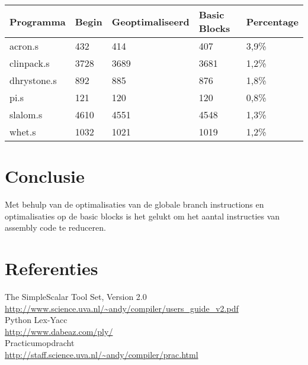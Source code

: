 \documentclass[11pt]{article}
\begin{document}
\begin{tabular}{|l|l|l|l|l|}
\hline
Programma & Begin & Geoptimaliseerd & Basic Blocks & Percentage\\
\hline
acron.s     & 432  & 414  & 407  & 3,9\%\\
clinpack.s  & 3728 & 3689 & 3681 & 1,2\%\\
dhrystone.s & 892  & 885  & 876  & 1,8\%\\
pi.s        & 121  & 120  & 120  & 0,8\%\\
slalom.s    & 4610 & 4551 & 4548 & 1,3\%\\
whet.s      & 1032 & 1021 & 1019 & 1,2\%\\
\hline
\end{tabular}

\section{Conclusie}
Met behulp van de optimalisaties van de globale branch instructions en 
optimalisaties op de basic blocks is het gelukt om het aantal instructies
van assembly code te reduceren. 

\section{Referenties}

The SimpleScalar Tool Set, Version 2.0\\
\url{http://www.science.uva.nl/~andy/compiler/users_guide_v2.pdf}\\
Python Lex-Yacc\\
\url{http://www.dabeaz.com/ply/}\\
Practicumopdracht\\
\url{http://staff.science.uva.nl/~andy/compiler/prac.html}
\end{document}

